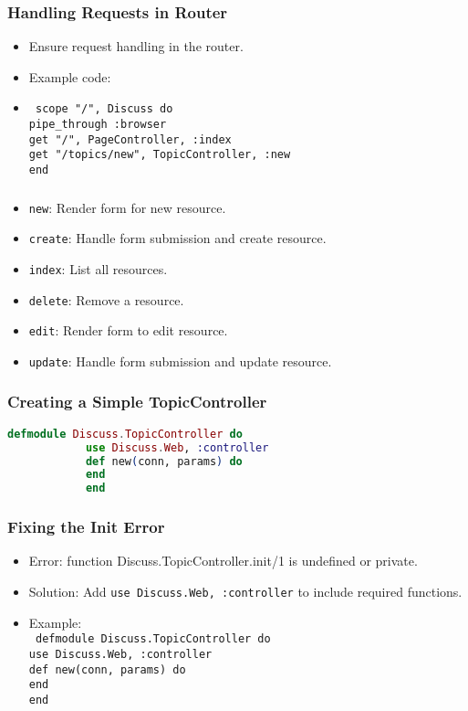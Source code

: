 \documentclass[aspectratio=169, table]{beamer}
\begin{document}
	
	\begin{frame}
		\frametitle{Handling Requests in Router}
		\begin{itemize}
			\item Ensure request handling in the router.
			\item Example code:
			\item 
			\texttt{
				scope "/", Discuss do\\
				pipe\_through :browser\\
				get "/", PageController, :index\\
				get "/topics/new", TopicController, :new\\
				end
				}
		\end{itemize}
	\end{frame}
	
	\begin{frame}
		\frametitle{}
		\begin{itemize}
			\item \texttt{new}: Render form for new resource.
			\item \texttt{create}: Handle form submission and create resource.
			\item \texttt{index}: List all resources.
			\item \texttt{delete}: Remove a resource.
			\item \texttt{edit}: Render form to edit resource.
			\item \texttt{update}: Handle form submission and update resource.
		\end{itemize}
	\end{frame}
	
	\begin{frame}[fragile]
		\frametitle{Creating a Simple TopicController}
		\begin{lstlisting}[language=Elixir]
			defmodule Discuss.TopicController do
			use Discuss.Web, :controller
			def new(conn, params) do
			end
			end
		\end{lstlisting}
	\end{frame}
	
	\begin{frame}
		\frametitle{Fixing the Init Error}
		\begin{itemize}
			\item Error: function Discuss.TopicController.init/1 is undefined or private.
			\item Solution: Add \texttt{use Discuss.Web, :controller} to include required functions.
			\item Example: \\ \texttt{
				defmodule Discuss.TopicController do\\
				use Discuss.Web, :controller\\
				def new(conn, params) do\\
				end\\
				end
			}
		\end{itemize}
	\end{frame}
	
\end{document}
